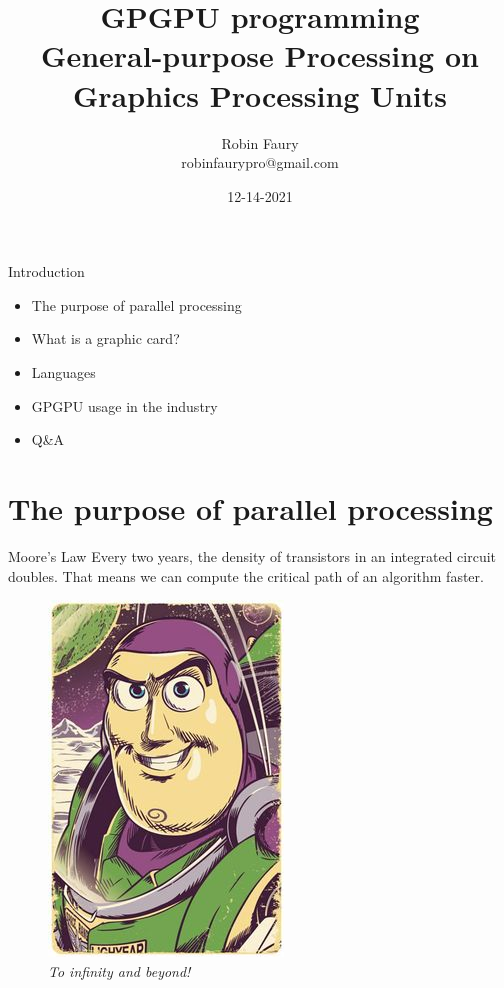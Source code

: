 \documentclass{beamer}
\title{GPGPU programming\\General-purpose Processing on Graphics Processing Units}
\author{Robin Faury\\robinfaurypro@gmail.com}
\date{12-14-2021}
\begin{document}
\begin{frame}
\titlepage
\end{frame}

\begin{frame}{Introduction}
	\begin{itemize}
		\item The purpose of parallel processing
		\item What is a graphic card?
		\item Languages
		\item GPGPU usage in the industry
		\item Q\&A
	\end{itemize}
\end{frame}

\section{The purpose of parallel processing}
\begin{frame}{Moore's Law}
	Every two years, the density of transistors in an integrated circuit doubles. That means we can compute the critical path of an algorithm faster.
	\begin{figure}
		\includegraphics[scale=0.2]{figures/buzz1.jpg}
		\caption{\textit{To infinity and beyond!}}
	\end{figure}
\end{frame}
\end{document}
